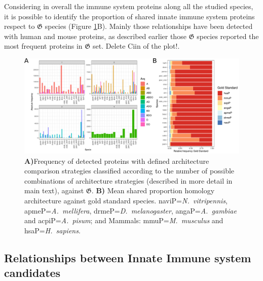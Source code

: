\documentclass[11pt]{article}
\newcommand{\TODO}[1]{\begingroup\color{red}#1\endgroup}
\begin{document}
Considering in overall the immune system proteins along all the studied 
species, it is possible to identify the proportion of shared innate immune 
system proteins respect to $\boldsymbol{\mathfrak{G}}$ species (Figure 
\ref{fig:FrecEstrat}B). Mainly those relationships have been detected with human 
and mouse proteins, as described earlier those $\boldsymbol{\mathfrak{G}}$ 
species reported the most frequent proteins in $\boldsymbol{\mathfrak{G}}$ set.
\TODO{Delete Ciin of the plot!}.
\begin{figure}[ht!]
\centering
\includegraphics[scale=0.43]{figures/unitedComparedGOLD}%
\caption{\textbf{A)}Frequency of detected proteins with defined architecture
comparison strategies classified according to the number of possible combinations of 
architecture strategies (described in more detail in main text), 
against $\boldsymbol{\mathfrak{G}}$. \textbf{B)} Mean shared proportion 
homology architecture against gold standard species. \textsf{naviP=}\textit{N.\ 
vitripennis}, \textsf{apmeP=}\textit{A.\ mellifera}, \textsf{drmeP=}\textit{D.\ 
melanogaster}, \textsf{angaP=}\textit{A.\ gambiae} and 
\textsf{acpiP=}\textit{A.\ pisum}; and Mammals: 
\textsf{mmuP=}\textit{M.\ musculus} and \textsf{hsaP=}\textit{H.\ sapiens}.}
\label{fig:FrecEstrat}
\end{figure}


\subsection*{Relationships between Innate Immune system candidates} 
\label{Orthology}
\end{document}
